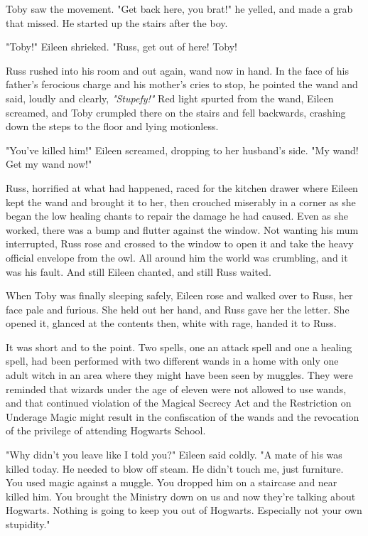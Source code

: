 Toby saw the movement. "Get back here, you brat!" he yelled, and made a grab that missed. He started up the stairs after the boy.

"Toby!" Eileen shrieked. "Russ, get out of here! Toby!

Russ rushed into his room and out again, wand now in hand. In the face of his father's ferocious charge and his mother's cries to stop, he pointed the wand and said, loudly and clearly, \emph{"Stupefy!"} Red light spurted from the wand, Eileen screamed, and Toby crumpled there on the stairs and fell backwards, crashing down the steps to the floor and lying motionless.

"You've killed him!" Eileen screamed, dropping to her husband's side. "My wand! Get my wand now!"

Russ, horrified at what had happened, raced for the kitchen drawer where Eileen kept the wand and brought it to her, then crouched miserably in a corner as she began the low healing chants to repair the damage he had caused. Even as she worked, there was a bump and flutter against the window. Not wanting his mum interrupted, Russ rose and crossed to the window to open it and take the heavy official envelope from the owl. All around him the world was crumbling, and it was his fault. And still Eileen chanted, and still Russ waited.

When Toby was finally sleeping safely, Eileen rose and walked over to Russ, her face pale and furious. She held out her hand, and Russ gave her the letter. She opened it, glanced at the contents then, white with rage, handed it to Russ.

It was short and to the point. Two spells, one an attack spell and one a healing spell, had been performed with two different wands in a home with only one adult witch in an area where they might have been seen by muggles. They were reminded that wizards under the age of eleven were not allowed to use wands, and that continued violation of the Magical Secrecy Act and the Restriction on Underage Magic might result in the confiscation of the wands and the revocation of the privilege of attending Hogwarts School.

"Why didn't you leave like I told you?" Eileen said coldly. "A mate of his was killed today. He needed to blow off steam. He didn't touch me, just furniture. You used magic against a muggle. You dropped him on a staircase and near killed him. You brought the Ministry down on us and now they're talking about Hogwarts. Nothing is going to keep you out of Hogwarts. Especially not your own stupidity."

